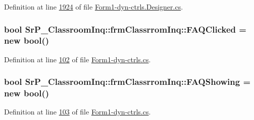 \-Definition at line \hyperlink{_form1-dyn-ctrls_8_designer_8cs_source_l01924}{1924} of file \hyperlink{_form1-dyn-ctrls_8_designer_8cs_source}{\-Form1-\/dyn-\/ctrls.\-Designer.\-cs}.

\hypertarget{class_sr_p___classroom_inq_1_1frm_classrrom_inq_a2b3fd84c890215dd61c54946b49906d2}{
\subsubsection[{\-F\-A\-Q\-Clicked}]{\setlength{\rightskip}{0pt plus 5cm}bool {\bf \-Sr\-P\-\_\-\-Classroom\-Inq\-::frm\-Classrrom\-Inq\-::\-F\-A\-Q\-Clicked} = new bool()}}
\label{class_sr_p___classroom_inq_1_1frm_classrrom_inq_a2b3fd84c890215dd61c54946b49906d2}


\-Definition at line \hyperlink{_form1-dyn-ctrls_8cs_source_l00102}{102} of file \hyperlink{_form1-dyn-ctrls_8cs_source}{\-Form1-\/dyn-\/ctrls.\-cs}.

\hypertarget{class_sr_p___classroom_inq_1_1frm_classrrom_inq_a37a892198dda5bfa752c66df2debb199}{
\subsubsection[{\-F\-A\-Q\-Showing}]{\setlength{\rightskip}{0pt plus 5cm}bool {\bf \-Sr\-P\-\_\-\-Classroom\-Inq\-::frm\-Classrrom\-Inq\-::\-F\-A\-Q\-Showing} = new bool()}}
\label{class_sr_p___classroom_inq_1_1frm_classrrom_inq_a37a892198dda5bfa752c66df2debb199}


\-Definition at line \hyperlink{_form1-dyn-ctrls_8cs_source_l00103}{103} of file \hyperlink{_form1-dyn-ctrls_8cs_source}{\-Form1-\/dyn-\/ctrls.\-cs}.

